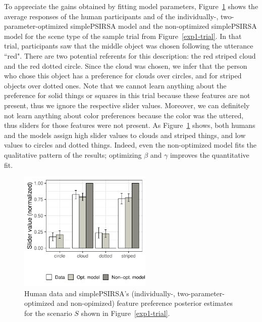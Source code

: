 \documentclass[10pt,a4paper]{article}
\begin{document}
To appreciate the gains obtained by fitting model parameters, Figure~\ref{barplot_x4} shows the average responses of the human participants and of the individually-, two-parameter-optimized simplePSIRSA model and the non-optimized simplePSIRSA model for the scene type of the sample trial from Figure~\ref{exp1-trial}.
In that trial, participants saw that the middle object was chosen following the utterance ``red". There are two potential referents for this description: the red striped cloud and the red dotted circle. Since the cloud was chosen, we infer that the person who chose this object has a preference for clouds over circles, and for striped objects over dotted ones. 
Note that we cannot learn anything about the preference for solid things or squares in this trial because these features are not present, thus we ignore the respective slider values. 
Moreover, we can definitely not learn anything about color preferences because the color was the uttered, thus sliders for those features were not present.  
As Figure~\ref{barplot_x4} shows, both humans and the models assign high slider values to clouds and striped things, and low values to circles and dotted things. Indeed, even the non-optimized model fits the qualitative pattern of the results; optimizing $\beta$ and $\gamma$ improves the quantitative fit.


\begin{figure}[ht!]
	\centering
	\includegraphics[width=2.5in]{images/december_barplot_x4.pdf}
	\caption{Human data and simplePSIRSA's (individually-, two-parameter-optimized and non-opimized) feature preference posterior estimates for the scenario $S$ shown in Figure~\ref{exp1-trial}.}\label{barplot_x4}
\end{figure}
\end{document}
